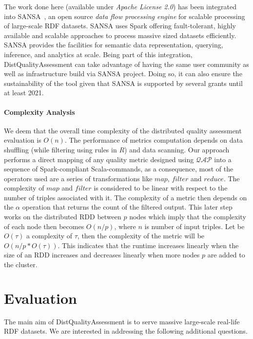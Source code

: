 The work done here (available under \textit{Apache License 2.0}) has been integrated into SANSA~\cite{lehmann-2017-sansa-iswc}, an open source \emph{data flow processing engine} for scalable processing of large-scale RDF datasets. 
SANSA uses Spark offering fault-tolerant, highly available and scalable approaches to process massive sized datasets efficiently. SANSA provides the facilities for semantic data representation, querying, inference, and analytics at scale.
Being part of this integration, DistQualityAssessment can take advantage of having the same user community as well as infrastructure build via SANSA project.
Doing so, it can also ensure the sustainability of the tool given that SANSA is supported by several grants until at least 2021.

\paragraph{\textbf{Complexity Analysis}}
We deem that the overall time complexity of the distributed quality assessment evaluation is $O(n)$.
The performance of metrics computation depends on data shuffling (while filtering using rules in $R$) and data scanning. 
Our approach performs a direct mapping of any quality metric designed using $\mathcal{QAP}$ into a sequence of Spark-compliant Scala-commands, as a consequence, most of the operators used are a series of transformations like $map$, $filter$ and $reduce$.
The complexity of $map$ and $filter$ is considered to be linear with respect to the number of triples associated with it. 
The complexity of a metric then depends on the $\alpha$ operation that returns the count of the filtered output.
This later step works on the distributed RDD between $p$ nodes which imply that the complexity of each node then becomes $O(n/p)$, where $n$ is number of input triples.
Let be $O(\tau)$ a complexity of $\tau$, then the complexity of the metric will be $O(n/p*O(\tau))$.
This indicates that the runtime increases linearly when the size of an RDD increases and decreases linearly when more nodes $p$ are added to the cluster.


\section{Evaluation}
\label{sec:distqualityassessment-evaluation}

The main aim of DistQualityAssessment is to serve massive large-scale real-life RDF datasets. 
We are interested in addressing the following additional questions.

